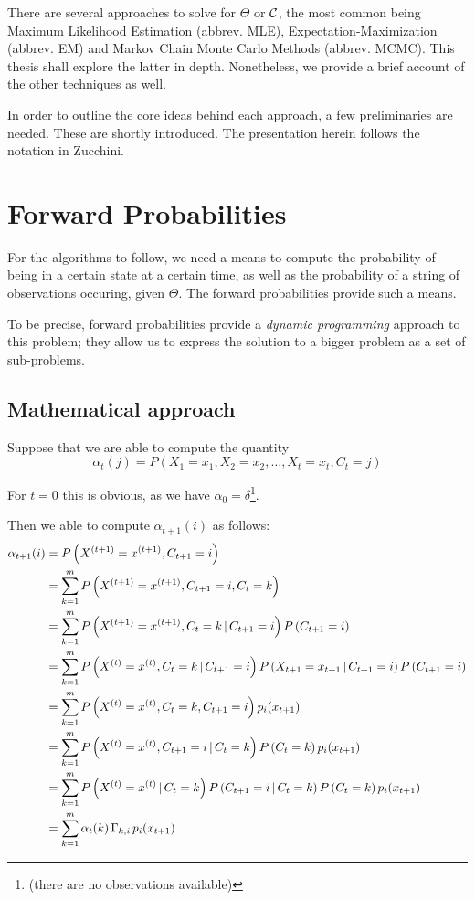 There are several approaches to solve for $\Theta$ or $\mathcal{C}$, the most common being Maximum Likelihood Estimation (abbrev. MLE), Expectation-Maximization (abbrev. EM) and Markov Chain Monte Carlo Methods (abbrev. MCMC). This thesis shall explore the latter in depth. Nonetheless, we provide a brief account of the other techniques as well.

In order to outline the core ideas behind each approach, a few preliminaries are needed. These are shortly introduced. The presentation herein follows the notation in Zucchini.


\section{Forward Probabilities}
For the algorithms to follow, we need a means to compute the probability of being in a certain state at a certain time, as well as the probability of a string of observations occuring, given $\Theta$. The forward probabilities provide such a means. 

To be precise, forward probabilities provide a \textit{dynamic programming} approach to this problem; they allow us to express the solution to a bigger problem as a set of sub-problems. 


\subsection{Mathematical approach}
\label{chap_math_approach}
Suppose that we are able to compute the quantity 
\[
	\alpha_t(j) = P\left(X_1 = x_1, X_2 = x_2, \dots, X_t = x_t, C_t = j\right)
\]

For $t=0$ this is obvious, as we have $\alpha_0 = \delta$\footnote{(there are no observations available)}. 

Then we able to compute $\alpha_{t+1}(i)$ as follows:
\begin{align}
	\alpha_{t+1}(i) 
	&=  P\left(X^{(t+1)} = x^{(t+1)},  C_{t+1} = i\right) \\
	 &=  \sum_{k=1}^m P\left(X^{(t+1)} = x^{(t+1)}, C_{t+1} = i, C_t = k\right) \\ 
	 &= \sum_{k=1}^m P\left(X^{(t+1)} = x^{(t+1)}, C_t = k \, | \,  C_{t+1} = i\right) P \left( C_{t+1} = i \right) \\
	 &= \sum_{k=1}^m P\left(X^{(t)} = x^{(t)}, C_t = k \, | \,  C_{t+1} = i\right) P\left(X_{t+1} = x_{t+1} \, | \,  C_{t+1} = i\right) P \left( C_{t+1} = i \right) \\
	 &= \sum_{k=1}^m P \left( X^{(t)} = x^{(t)}, C_t = k, C_{t+1} = i  \right) p_i(x_{t+1}) \\
	 &= \sum_{k=1}^m P\left(
	 	X^{(t)} = x^{(t)}, C_{t+1} = i \, | \, C_t = k\right) P\left( C_t = k\right) p_i(x_{t+1})\\
 	&= \sum_{k=1}^m P\left(
 		X^{(t)} = x^{(t)} \, | \, C_t = k\right) P\left( C_{t+1} = i \, | \, C_t = k\right) P\left( C_t = k\right) p_i(x_{t+1})\\
 	&=  \sum_{k=1}^m \alpha_t(k)  \, \Gamma_{k, i} \, p_i(x_{t+1}) \\
 	\label{llrecursion}
\end{align}

